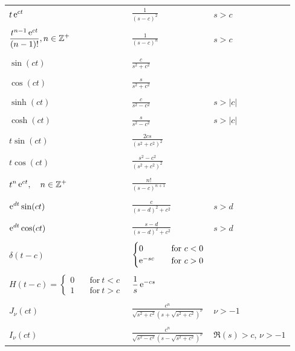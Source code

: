 \begin{longtable}{lll}
  \\
  $\displaystyle t \mathop{\mathrm{e}}\nolimits^{c t}$
  & $\displaystyle \frac{1}{(s-c)^2}$
  & $s > c$ \\
  \\
  $\displaystyle \frac{t^{n-1} \mathop{\mathrm{e}}\nolimits^{c t}}{(n-1)!}, 
  n \in \mathbb{Z}^+$
  & $\displaystyle \frac{1}{(s-c)^n}$
  & $s > c$ \\
  \\
  $\displaystyle \sin(c t)$
  & $\displaystyle \frac{c}{s^2 + c^2}$
  & \\
  \\
  $\displaystyle \cos(c t)$
  & $\displaystyle \frac{s}{s^2 + c^2}$
  & \\
  \\
  $\displaystyle \sinh(c t)$
  & $\displaystyle \frac{c}{s^2-c^2}$
  & $s > |c|$ \\
  \\
  $\displaystyle \cosh(c t)$
  & $\displaystyle \frac{s}{s^2 - c^2}$
  & $s > |c|$ \\
  \\
  $\displaystyle t \sin(c t)$
  & $\displaystyle \frac{2c s}{(s^2 + c^2)^2}$
  & \\
  \\
  $\displaystyle t \cos(c t)$
  & $\displaystyle \frac{s^2 - c^2}{(s^2+c^2)^2}$
  & \\
  \\
  $\displaystyle t^n \mathop{\mathrm{e}}\nolimits^{c t} , \quad n \in \mathbb{Z}^+$
  & $\displaystyle \frac{n!}{(s-c)^{n+1}}$
  & \\
  \\
  $\displaystyle \mathop{\mathrm{e}}\nolimits^{d t} \sin(c t)$
  & $\displaystyle \frac{c}{(s-d)^2 + c^2}$
  & $s > d$ \\
  \\
  $\displaystyle \mathop{\mathrm{e}}\nolimits^{d t} \cos(c t)$
  & $\displaystyle \frac{s - d}{(s-d)^2+c^2}$
  & $s > d$ \\
  \\
  $\displaystyle \delta(t-c)$
  & $\displaystyle \begin{cases}
    0 \quad &\mathrm{for}\  c < 0 \\
    \mathop{\mathrm{e}}\nolimits^{-s c} \quad &\mathrm{for}\ c > 0
  \end{cases}$
  & \\
  \\
  $\displaystyle H(t-c) = \begin{cases}
    0 \quad &\mathrm{for}\ t < c \\
    1 \quad &\mathrm{for}\ t > c
  \end{cases}$
  & $\displaystyle \frac{1}{s}\mathop{\mathrm{e}}\nolimits^{-c s}$
  & \\
  \\
  $\displaystyle J_\nu(c t)$
  & $\displaystyle \frac{c^n}{\sqrt{s^2 + c^2} 
    \left( s + \sqrt{s^2 + c^2} \right)^\nu}$
  & $\nu > -1$ \\
  \\
  $\displaystyle I_\nu(c t)$
  & $\displaystyle \frac{c^n}{\sqrt{s^2 - c^2} 
    \left( s - \sqrt{s^2 + c^2} \right)^\nu}$
  & $\Re(s) > c$, $\nu > -1$
\end{longtable}










